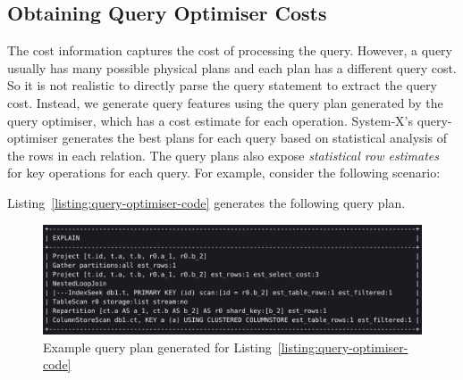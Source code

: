 \subsection{Obtaining Query Optimiser Costs}
The cost information captures the cost of processing the query. However, a query usually has many possible physical plans and each plan has a different query cost. So it is not realistic to directly parse the query statement to extract the query cost. Instead, we generate query features using the query plan generated by the query optimiser, which has a cost estimate for each operation. System-X's query-optimiser generates the best plans for each query based on statistical analysis of the rows in each relation. The query plans also expose \textit{statistical row estimates} for key operations for each query. For example, consider the following scenario:


Listing~\ref{listing:query-optimiser-code} generates the following query plan.

\begin{figure}[h]
  \centering
  \includegraphics[width=\linewidth]{figures/explain-example.png}
  \caption{Example query plan generated for Listing~\ref{listing:query-optimiser-code}}
  \label{fig:explain-example}
\end{figure}

